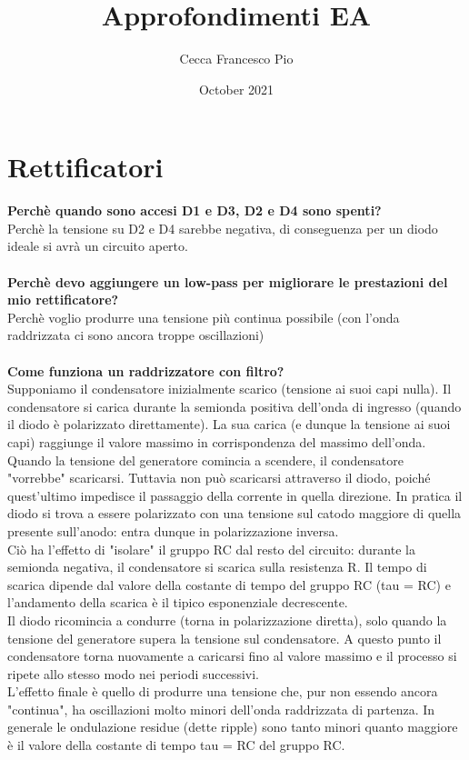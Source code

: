 \documentclass{article}
\title{Approfondimenti EA}
\author{Cecca Francesco Pio}
\date{October 2021}
\begin{document}
\maketitle

\section{Rettificatori}

\textbf{Perchè quando sono accesi D1 e D3, D2 e D4 sono spenti? } \\
Perchè la tensione su D2 e D4 sarebbe negativa, di conseguenza per un diodo ideale si avrà un circuito aperto. \\ \\
\textbf{Perchè devo aggiungere un low-pass per migliorare le prestazioni del mio rettificatore?} \\
Perchè voglio produrre una tensione più continua possibile (con l'onda raddrizzata ci sono ancora troppe oscillazioni) \\ \\
\textbf{Come funziona un raddrizzatore con filtro?} \\
Supponiamo il condensatore inizialmente scarico (tensione ai suoi capi nulla). Il condensatore si carica durante la semionda positiva dell'onda di ingresso (quando il diodo è polarizzato direttamente). La sua carica (e dunque la tensione ai suoi capi) raggiunge il valore massimo in corrispondenza del massimo dell'onda. \\
Quando la tensione del generatore comincia a scendere, il condensatore "vorrebbe" scaricarsi. Tuttavia non può scaricarsi attraverso il diodo, poiché quest'ultimo impedisce il passaggio della corrente in quella direzione. In pratica il diodo si trova a essere polarizzato con una tensione sul catodo maggiore di quella presente sull'anodo: entra dunque in polarizzazione inversa. \\
Ciò ha l'effetto di "isolare" il gruppo RC dal resto del circuito: durante la semionda negativa, il condensatore si scarica sulla resistenza R. Il tempo di scarica dipende dal valore della costante di tempo del gruppo RC (tau = RC) e l'andamento della scarica è il tipico esponenziale decrescente. \\
Il diodo ricomincia a condurre (torna in polarizzazione diretta), solo quando la tensione del generatore supera la tensione sul condensatore. A questo punto il condensatore torna nuovamente a caricarsi fino al valore massimo e il processo si ripete allo stesso modo nei periodi successivi. \\
L'effetto finale è quello di produrre una tensione che, pur non essendo ancora "continua", ha oscillazioni molto minori dell'onda raddrizzata di partenza. In generale le ondulazione residue (dette ripple) sono tanto minori quanto maggiore è il valore della costante di tempo tau = RC del gruppo RC.
\end{document}
